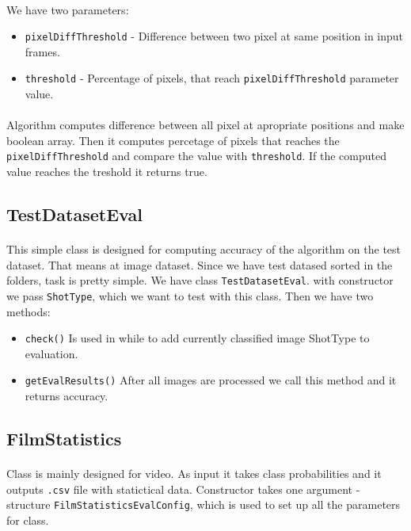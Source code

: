 \documentclass[english]{article}
\begin{document}
		\paragraph{}
			We have two parameters:
			\begin{itemize}
				\item \texttt{pixelDiffThreshold} - Difference between two pixel at same position in input frames.
				\item \texttt{threshold} - Percentage of pixels, that reach \texttt{pixelDiffThreshold} parameter value.
			\end{itemize}
		\paragraph{}
			Algorithm computes difference between all pixel at apropriate positions and make boolean array. Then 
			it computes percetage of pixels that reaches the \texttt{pixelDiffThreshold} and compare the value with \texttt{threshold}.
			If the computed value reaches the treshold it returns true.
			

	\subsection{TestDatasetEval}
		\paragraph{}
			This simple class is designed for computing accuracy of the algorithm on the test dataset. That means at image dataset.
			Since we have test datased sorted in the folders, task is pretty simple. We have class \texttt{TestDatasetEval}.
			with constructor we pass \texttt{ShotType}, which we want to test with this class. Then we have two methods:
			\begin{itemize}
				\item \texttt{check()} Is used in while to add currently classified image ShotType to evaluation.
				\item \texttt{getEvalResults()} After all images are processed we call this method and it returns accuracy.
			\end{itemize}

	\subsection{FilmStatistics}
		\paragraph{}
			Class is mainly designed for video. As input it takes class probabilities and it outputs \texttt{.csv} file with
			statictical data. Constructor takes one argument - structure \texttt{FilmStatisticsEvalConfig}, which is used to set up all the parameters
			for class.
\end{document}
